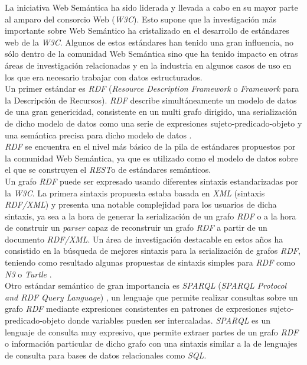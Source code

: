 La iniciativa Web Sem\'antica ha sido liderada y llevada a cabo en su mayor parte al amparo del consorcio Web (\textit{W3C}). Esto supone que la investigaci\'on m\'as importante sobre Web Sem\'antico ha cristalizado en el desarrollo de est\'andares web de la \textit{W3C}. Algunos de estos est\'andares han tenido una gran influencia, no s\'olo dentro de la comunidad Web Sem\'antica sino que ha tenido impacto en otras \'areas de investigaci\'on relacionadas y en la industria en algunos casos de uso en los que era necesario trabajar con datos estructurados.\\
Un primer est\'andar es \textit{RDF} (\textit{Resource Description Framework} o \textit{Framework} para la Descripci\'on de Recursos). \textit{RDF} describe simult\'aneamente un modelo de datos de una gran genericidad, consistente en un multi grafo dirigido, una serializaci\'on de dicho modelo de datos como una serie de expresiones sujeto-predicado-objeto y una sem\'antica precisa para dicho modelo de datos \cite{hayes2004rdf}.\\
\textit{RDF} se encuentra en el nivel m\'as b\'asico de la pila de est\'andares propuestos por la comunidad Web Sem\'antica, ya que es utilizado como el modelo de datos sobre el que se construyen el \textit{REST}o de est\'andares sem\'anticos.\\
Un grafo \textit{RDF} puede ser expresado usando diferentes sintaxis estandarizadas por la \textit{W3C}. La primera sintaxis propuesta estaba basada en \textit{XML} (sintaxis \textit{RDF/XML}) \cite{beckett2004rdf} y presenta una notable complejidad para los usuarios de dicha sintaxis, ya sea a la hora de generar la serializaci\'on de un grafo \textit{RDF} o a la hora de construir un \textit{parser} capaz de reconstruir un grafo \textit{RDF} a partir de un documento \textit{RDF/XML}. Un \'area de investigaci\'on destacable en estos a\~nos ha consistido en la b\'usqueda de mejores sintaxis para la serializaci\'on de grafos \textit{RDF}, teniendo como resultado algunas propuestas de sintaxis simples para \textit{RDF} como \textit{N3} \cite{n3} o \textit{Turtle} \cite{turtle}.\\
Otro est\'andar sem\'antico de gran importancia es \textit{SPARQL} (\textit{SPARQL Protocol and RDF Query Language}) \cite{sparql}, un lenguaje que permite realizar consultas sobre un grafo \textit{RDF} mediante expresiones consistentes en patrones de expresiones sujeto-predicado-objeto donde variables pueden ser intercaladas. \textit{SPARQL} es un lenguaje de consulta muy expresivo, que permite extraer partes de un grafo \textit{RDF} o informaci\'on particular de dicho grafo con una sintaxis similar a la de lenguajes de consulta para bases de datos relacionales como \textit{SQL}.\\
